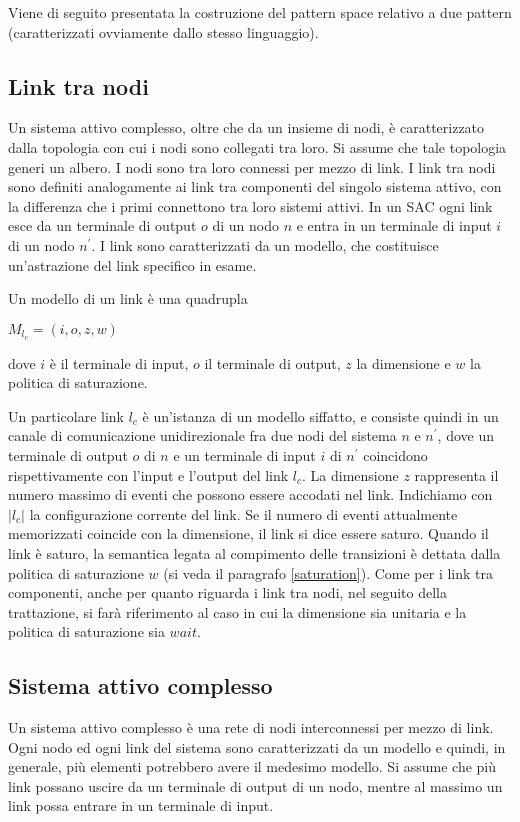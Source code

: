 \begin{ex}
Viene di seguito presentata la costruzione del pattern space relativo a due pattern (caratterizzati ovviamente dallo stesso linguaggio).
\end{ex}

\subsection{Link tra nodi}
Un sistema attivo complesso, oltre che da un insieme di nodi, è caratterizzato dalla topologia con cui i nodi sono collegati tra loro. Si assume che tale topologia generi un albero.
I nodi sono tra loro connessi per mezzo di link. I link tra nodi sono definiti analogamente ai link tra componenti del singolo sistema attivo, con la differenza che i primi connettono tra loro sistemi attivi.
In un SAC ogni link esce da un terminale di output $o$ di un nodo $n$ e entra in un terminale di input $i$ di un nodo $n^\prime$.
I link sono caratterizzati da un modello, che costituisce un'astrazione del link specifico in esame.

\begin{defn}
Un modello di un link è una quadrupla
\begin{center}
	$M_{l_c} = (i,o,z,w)$
\end{center}
dove $i$ è il terminale di input, $o$ il terminale di output, $z$ la dimensione e $w$ la politica di saturazione.
\end{defn}
Un particolare link $l_c$ è un'istanza di un modello siffatto, e consiste quindi in un canale di comunicazione unidirezionale fra due nodi del sistema $n$ e $n^\prime$, dove un terminale di output $o$ di $n$ e un terminale di input $i$ di $n^\prime$ coincidono rispettivamente con l'input e l'output del link $l_c$.
La dimensione $z$ rappresenta il numero massimo di eventi che possono essere accodati nel link. 
Indichiamo con $|l_c|$ la configurazione corrente del link. 
Se il numero di eventi attualmente memorizzati coincide con la dimensione, il link si dice essere saturo.
Quando il link è saturo, la semantica legata al compimento delle transizioni è dettata dalla politica di saturazione $w$ (si veda il paragrafo \ref{saturation}).
Come per i link tra componenti, anche per quanto riguarda i link tra nodi, nel seguito della trattazione, si farà riferimento al caso in cui la dimensione sia unitaria e la politica di saturazione sia $wait$.

\subsection{Sistema attivo complesso}
Un sistema attivo complesso è una rete di nodi interconnessi per mezzo di link. Ogni nodo ed ogni link del sistema sono caratterizzati da un modello e quindi, in generale, più elementi potrebbero avere il medesimo modello. Si assume che più link possano uscire da un terminale di output di un nodo, mentre al massimo un link possa entrare in un terminale di input.

